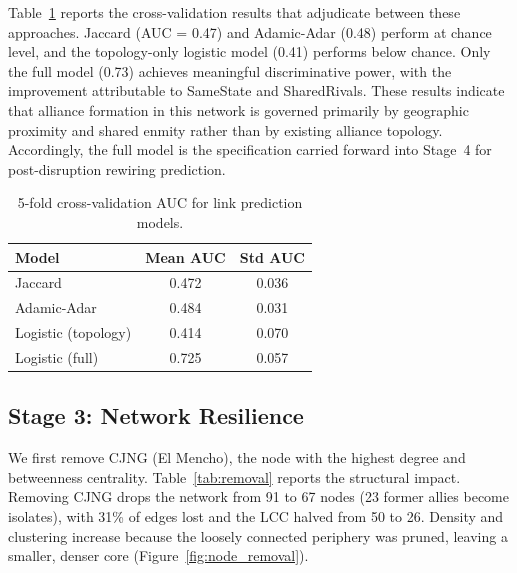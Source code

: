\documentclass[11pt, a4paper]{article}
\begin{document}
Table~\ref{tab:auc} reports the cross-validation results that adjudicate between these approaches. Jaccard (AUC = 0.47) and Adamic-Adar (0.48) perform at chance level, and the topology-only logistic model (0.41) performs below chance. Only the full model (0.73) achieves meaningful discriminative power, with the improvement attributable to SameState and SharedRivals. These results indicate that alliance formation in this network is governed primarily by geographic proximity and shared enmity rather than by existing alliance topology. Accordingly, the full model is the specification carried forward into Stage~4 for post-disruption rewiring prediction.

\begin{table}[H]
\centering
\caption{5-fold cross-validation AUC for link prediction models.}
\label{tab:auc}
\small
\begin{tabular}{lcc}
\toprule
\textbf{Model} & \textbf{Mean AUC} & \textbf{Std AUC} \\
\midrule
Jaccard & 0.472 & 0.036 \\
Adamic-Adar & 0.484 & 0.031 \\
Logistic (topology) & 0.414 & 0.070 \\
Logistic (full) & 0.725 & 0.057 \\
\bottomrule
\end{tabular}
\end{table}



\subsection{Stage 3: Network Resilience}\label{sec:results_resilience}

We first remove CJNG (El Mencho), the node with the highest degree and betweenness centrality. Table~\ref{tab:removal} reports the structural impact. Removing CJNG drops the network from 91 to 67 nodes (23 former allies become isolates), with 31\% of edges lost and the LCC halved from 50 to 26. Density and clustering increase because the loosely connected periphery was pruned, leaving a smaller, denser core (Figure~\ref{fig:node_removal}).
\end{document}

